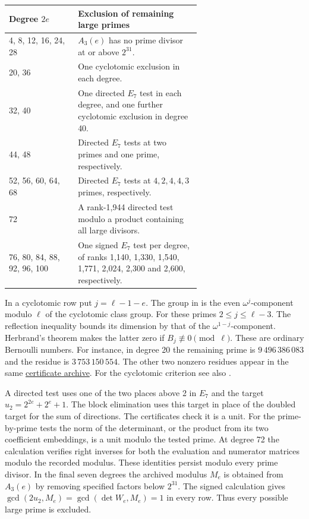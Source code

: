 \documentclass[11pt,a4paper]{article}
\begin{document}
\begin{center}
\small
\begin{tabular}{@{}l p{0.64\linewidth}@{}}\toprule
Degree \(2e\) & Exclusion of remaining large primes \\ \midrule
4, 8, 12, 16, 24, 28 & \(A_3(e)\) has no prime divisor at or above \(2^{31}\).\\
20, 36 & One cyclotomic exclusion in each degree.\\
32, 40 & One directed \(E_7\) test in each degree, and one further cyclotomic exclusion in degree 40.\\
44, 48 & Directed \(E_7\) tests at two primes and one prime, respectively.\\
52, 56, 60, 64, 68 & Directed \(E_7\) tests at \(4,2,4,4,3\) primes, respectively.\\
72 & A rank-1,944 directed test modulo a product containing all large divisors.\\
76, 80, 84, 88, 92, 96, 100 & One signed \(E_7\) test per degree, of ranks 1,140, 1,330, 1,540, 1,771, 2,024, 2,300 and 2,600, respectively.\\ \bottomrule
\end{tabular}
\end{center}

In a cyclotomic row put \(j=\ell-1-e\). The group in
\cite[Thm.~5.1]{jkpsz} is the even \(\omega^j\)-component modulo
\(\ell\) of the cyclotomic class group. For these primes
\(2\le j\le\ell-3\). The reflection inequality bounds its dimension by
that of the \(\omega^{1-j}\)-component. Herbrand's theorem makes the latter
zero if \(B_j\not\equiv0\pmod\ell\). These are ordinary Bernoulli numbers.
For instance, in degree 20 the remaining prime is \(9\,496\,386\,083\)
and the residue is \(3\,753\,150\,554\).
The other two nonzero residues appear in the same
\href{https://github.com/leopintar05/hecke-k-theory-104/releases/tag/v1.1}{certificate archive}.
For the cyclotomic criterion see also \cite[\S1]{ribet}.

A directed test uses one of the two places above 2 in \(E_7\) and the
target \(u_2=2^{2e}+2^e+1\). The block elimination uses this target
in place of the doubled target for the sum of directions. The
certificates check it is a unit. For the prime-by-prime tests the
norm of the determinant, or the product from its two coefficient embeddings,
is a unit modulo the tested prime. At degree 72 the calculation verifies
right inverses for both the evaluation and numerator matrices modulo the
recorded modulus. These identities persist modulo every prime divisor.
In the final seven degrees the archived modulus \(M_e\) is obtained from
\(A_3(e)\) by removing specified factors below \(2^{31}\). The signed
calculation gives \(\gcd(2u_2,M_e)=\gcd(\det W_e,M_e)=1\) in every row.
Thus every possible large prime is excluded.
\end{document}
